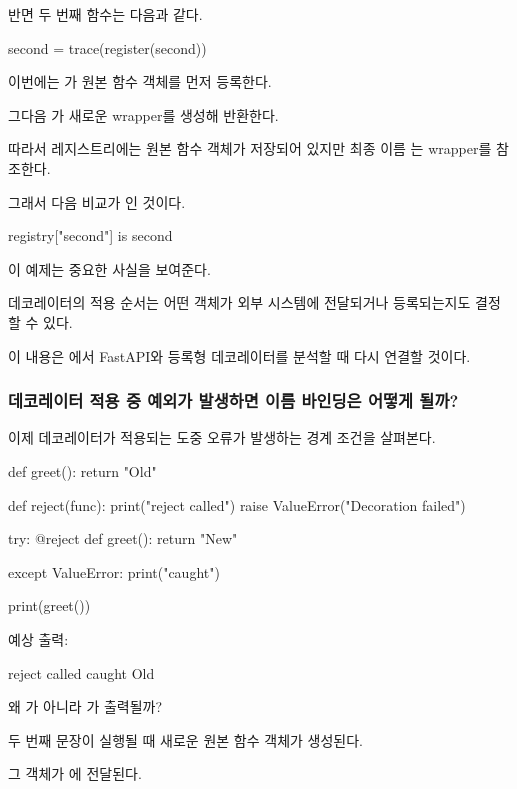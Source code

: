 반면 두 번째 함수는 다음과 같다.

\begin{dhkcode}
second = trace(register(second))
\end{dhkcode}

이번에는 가 원본 함수 객체를 먼저 등록한다.

그다음 가 새로운 wrapper를 생성해 반환한다.

따라서 레지스트리에는 원본 함수 객체가 저장되어 있지만 최종 이름 는 wrapper를 참조한다.

그래서 다음 비교가 인 것이다.

\begin{dhkcode}
registry["second"] is second
\end{dhkcode}

이 예제는 중요한 사실을 보여준다.

데코레이터의 적용 순서는 어떤 객체가 외부 시스템에 전달되거나 등록되는지도 결정할 수 있다.

이 내용은 에서 FastAPI와 등록형 데코레이터를 분석할 때 다시 연결할 것이다.

\subsubsection{데코레이터 적용 중 예외가 발생하면 이름 바인딩은 어떻게 될까?}

이제 데코레이터가 적용되는 도중 오류가 발생하는 경계 조건을 살펴본다.

\begin{dhkcode}
def greet():
    return "Old"


def reject(func):
    print("reject called")
    raise ValueError("Decoration failed")


try:
    @reject
    def greet():
        return "New"

except ValueError:
    print("caught")


print(greet())
\end{dhkcode}

예상 출력:

\begin{dhkzsh}
reject called
caught
Old
\end{dhkzsh}

왜 가 아니라 가 출력될까?

두 번째  문장이 실행될 때 새로운 원본 함수 객체가 생성된다.

그 객체가 에 전달된다.

